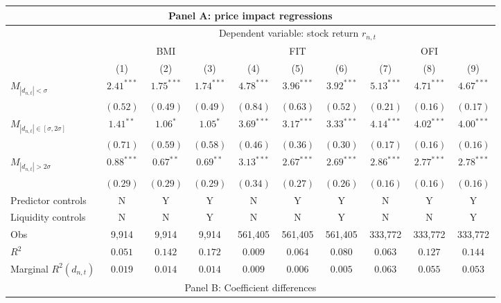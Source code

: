 \begin{tabular}{lccccccccc}
  \hline \multicolumn{10}{c}{Panel A: price impact regressions} \\
 \hline 
                                    & \multicolumn{9}{c}{Dependent variable: stock return $r_{n,t}$} \\

                                    \cmidrule(l){2-10} & \multicolumn{3}{c}{BMI} & \multicolumn{3}{c}{FIT} & \multicolumn{3}{c}{OFI} \\
 \cmidrule(l){2-4} \cmidrule(l){5-7} \cmidrule(l){8-10} 
  & (1) & (2) & (3) & (4) & (5) & (6) & (7) & (8) & (9) \\ 
  $M_{|d_{n,t}| < \sigma}$ & $2.41^{***}$ & $1.75^{***}$ & $1.74^{***}$ & $4.78^{***}$ & $3.96^{***}$ & $3.92^{***}$ & $5.13^{***}$ & $4.71^{***}$ & $4.67^{***}$ \\ 
   & $(0.52)$ & $(0.49)$ & $(0.49)$ & $(0.84)$ & $(0.63)$ & $(0.52)$ & $(0.21)$ & $(0.16)$ & $(0.17)$ \\ 
  $M_{|d_{n,t}| \in [\sigma, 2\sigma]}$ & $1.41^{**}$ & $1.06^{*}$ & $1.05^{*}$ & $3.69^{***}$ & $3.17^{***}$ & $3.33^{***}$ & $4.14^{***}$ & $4.02^{***}$ & $4.00^{***}$ \\ 
   & $(0.71)$ & $(0.59)$ & $(0.58)$ & $(0.46)$ & $(0.36)$ & $(0.30)$ & $(0.17)$ & $(0.16)$ & $(0.16)$ \\ 
  $M_{|d_{n,t}| > 2 \sigma}$ & $0.88^{***}$ & $0.67^{**}$ & $0.69^{**}$ & $3.13^{***}$ & $2.67^{***}$ & $2.69^{***}$ & $2.86^{***}$ & $2.77^{***}$ & $2.78^{***}$ \\ 
   \vspace{5pt} & $(0.29)$ & $(0.29)$ & $(0.29)$ & $(0.34)$ & $(0.27)$ & $(0.26)$ & $(0.16)$ & $(0.16)$ & $(0.16)$ \\ 
  Predictor controls & N & Y & Y & N & Y & Y & N & Y & Y \\ 
   \vspace{5pt}Liquidity controls & N & N & Y & N & N & Y & N & N & Y \\ 
  Obs & 9,914 & 9,914 & 9,914 & 561,405 & 561,405 & 561,405 & 333,772 & 333,772 & 333,772 \\ 
  $R^2$ & $0.051$ & $0.142$ & $0.172$ & $0.009$ & $0.064$ & $0.080$ & $0.063$ & $0.127$ & $0.144$ \\ 
  Marginal $R^2(d_{n,t})$ & $0.019$ & $0.014$ & $0.014$ & $0.009$ & $0.006$ & $0.005$ & $0.063$ & $0.055$ & $0.053$ \\ 
   \hline \multicolumn{10}{c}{Panel B: Coefficient differences} \\

\end{tabular}
